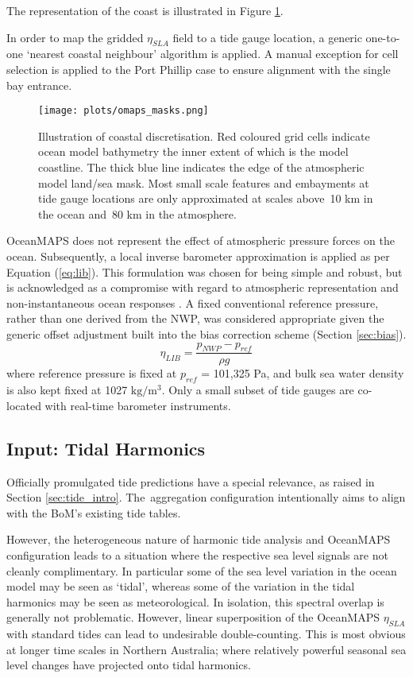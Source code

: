 \documentclass[jmse,article,accept,moreauthors,pdftex,10pt,a4paper]{mdpi}
\begin{document}
The representation of the coast is illustrated in Figure \ref{fig:map_masks}.

In order to map the gridded $\eta_{SLA}$ field to a tide gauge location, a generic one-to-one `nearest coastal neighbour' algorithm is applied.
A manual exception for cell selection is applied to the Port Phillip case to ensure alignment with the single bay entrance. 
\vspace{6pt}
\begin{figure}[H]
    \centering
    \texttt{[image: plots/omaps\_masks.png]}
    \caption{Illustration of coastal discretisation.  Red coloured grid cells indicate ocean model bathymetry the inner extent of which is the model coastline.  The thick blue line indicates the edge of the atmospheric model land/sea mask.  Most small scale features and embayments at tide gauge locations are only approximated at scales above~10 km in the ocean and~80 km in the atmosphere. }
    \label{fig:map_masks}
\end{figure}  


OceanMAPS does not represent the effect of atmospheric pressure forces on the ocean.
Subsequently, a local inverse barometer approximation is applied as per Equation (\ref{eq:lib}).
This formulation was chosen for being simple and robust, but is acknowledged as a compromise with regard to atmospheric representation and non-instantaneous ocean responses \cite{Mathers:2004bk}.
A fixed conventional reference pressure, rather than one derived from the NWP, was considered appropriate given the generic offset adjustment built into the bias correction scheme (Section \ref{sec:bias}).  
\begin{equation}
  \eta_{LIB} = \frac{ p_{NWP} - p_{ref} }{ \rho g }
  \label{eq:lib}
\end{equation}
where reference pressure is fixed at $p_{ref}$ = 101,325 Pa, and bulk sea water density is also kept fixed at 1027 $\text{kg}/\text{m}^3$.
Only a small subset of tide gauges are co-located with real-time barometer instruments.


\subsection{Input: Tidal Harmonics }
\label{sec:harmonics}
Officially promulgated tide predictions have a special relevance, as raised in Section \ref{sec:tide_intro}.
The~aggregation configuration intentionally aims to align with the BoM's existing tide tables. 

However, the heterogeneous nature of harmonic tide analysis and OceanMAPS configuration leads to a situation where the respective sea level signals are not cleanly complimentary.
In particular some of the sea level variation in the ocean model may be seen as `tidal', whereas some of the variation in the tidal harmonics may be seen as meteorological.   
In isolation, this spectral overlap is generally not problematic. 
However, linear superposition of the OceanMAPS $\eta_{SLA}$ with standard tides can lead to undesirable double-counting. 
This is most obvious at longer time scales in Northern Australia; where relatively powerful seasonal sea level changes have projected onto tidal harmonics.
\end{document}
